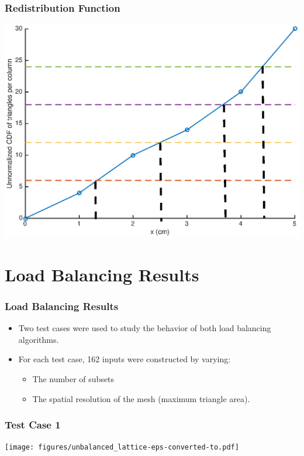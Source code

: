 \documentclass[compress]{beamer}
\begin{document}
\begin{frame}[t]\frametitle{Redistribution Function}
\centering
\includegraphics[scale = 0.5]{figures/after_redistribute.eps}
\end{frame}

\section{Load Balancing Results}
\begin{frame}[t]\frametitle{Load Balancing Results}
\begin{block}{}
\begin{itemize}
	\item Two test cases were used to study the behavior of both load balancing algorithms.
	\item For each test case, 162 inputs were constructed by varying:
		\begin{itemize}
		\item The number of subsets
		\item The spatial resolution of the mesh (maximum triangle area).
		\end{itemize}
\end{itemize}
\end{block}
\end{frame}

\begin{frame}[t]\frametitle{Test Case 1}
\centering
\texttt{[image: figures/unbalanced\_lattice-eps-converted-to.pdf]}
\end{frame}
\end{document}
